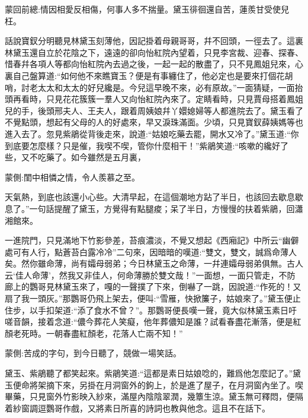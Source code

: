 
\begin{parag}
    \begin{note}蒙回前總:情因相愛反相傷，何事人多不揣量。黛玉徘徊還自苦，蓮羨甘受使兒枉。\end{note}
\end{parag}


\begin{parag}
    話說寶釵分明聽見林黛玉刻薄他，因記掛着母親哥哥，幷不回頭，一徑去了。這裏林黛玉還自立於花陰之下，遠遠的卻向怡紅院內望着，只見李宮裁、迎春、探春、惜春幷各項人等都向怡紅院內去過之後，一起一起的散盡了，只不見鳳姐兒來，心裏自己盤算道:“如何他不來瞧寶玉？便是有事纏住了，他必定也是要來打個花胡哨，討老太太和太太的好兒纔是。今兒這早晚不來，必有原故。”一面猜疑，一面抬頭再看時，只見花花簇簇一羣人又向怡紅院內來了。定睛看時，只見賈母搭着鳳姐兒的手，後頭邢夫人、王夫人，跟着周姨娘幷丫嬛媳婦等人都進院去了。黛玉看了不覺點頭，想起有父母的人的好處來，早又淚珠滿面。少頃，只見寶釵薛姨媽等也進入去了。忽見紫鵑從背後走來，說道:“姑娘吃藥去罷，開水又冷了。”黛玉道:“你到底要怎麼樣？只是催，我喫不喫，管你什麼相干！”紫鵑笑道:“咳嗽的纔好了些，又不吃藥了。如今雖然是五月裏，\begin{note}蒙側:閨中相憐之情，令人羨慕之至。\end{note}天氣熱，到底也該還小心些。大清早起，在這個潮地方跕了半日，也該回去歇息歇息了。”一句話提醒了黛玉，方覺得有點腿痠；呆了半日，方慢慢的扶着紫鵑，回瀟湘館來。
\end{parag}


\begin{parag}
    一進院門，只見滿地下竹影參差，苔痕濃淡，不覺又想起《西廂記》中所云“幽僻處可有人行，點蒼苔白露冷冷”二句來，因暗暗的嘆道:“雙文，雙文，誠爲命薄人矣。然你雖命薄，尚有孀母弱弟；今日林黛玉之命薄，一幷連孀母弱弟俱無。古人云‘佳人命薄’，然我又非佳人，何命薄勝於雙文哉！”一面想，一面只管走，不防廊上的鸚哥見林黛玉來了，嘎的一聲撲了下來，倒嚇了一跳，因說道:“作死的！又扇了我一頭灰。”那鸚哥仍飛上架去，便叫:“雪雁，快掀簾子，姑娘來了。”黛玉便止住步，以手扣架道:“添了食水不曾？”。那鸚哥便長嘆一聲，竟大似林黛玉素日吁嗟音韻，接着念道:“儂今葬花人笑癡，他年葬儂知是誰？試看春盡花漸落，便是紅顏老死時。一朝春盡紅顏老，花落人亡兩不知！”\begin{note}蒙側:苦成的字句，到今日聽了，競做一場笑話。\end{note}黛玉、紫鵑聽了都笑起來。紫鵑笑道:“這都是素日姑娘唸的，難爲他怎麼記了。”黛玉便命將架摘下來，另掛在月洞窗外的鉤上，於是進了屋子，在月洞窗內坐了。喫畢藥，只見窗外竹影映入紗來，滿屋內陰陰翠潤，幾簟生涼。黛玉無可釋悶，便隔着紗窗調逗鸚哥作戲，又將素日所喜的詩詞也教與他念。這且不在話下。
\end{parag}



